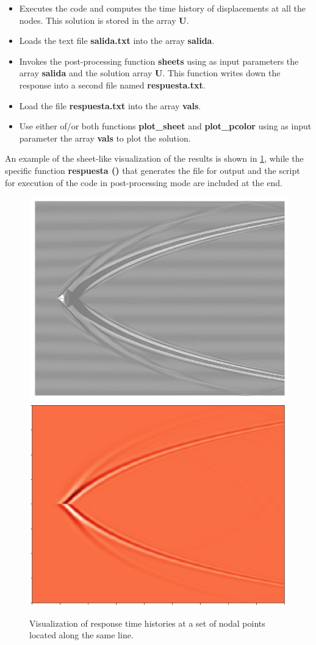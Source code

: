 \documentclass[11pt,letterpaper]{article}
\begin{document}
\begin{itemize}
\item Executes the code and computes the time history of displacements at all the nodes. This solution is stored in the array {\bf U}.
\item Loads the text file {\bf salida.txt} into the array {\bf salida}.
\item Invokes the post-processing function {\bf sheets} using as input parameters the array {\bf salida} and the solution array {\bf U}. This function writes down the response into a second file named {\bf respuesta.txt}.
\item Load the file {\bf respuesta.txt} into the array {\bf vals}.
\item Use either of/or both functions {\bf plot_sheet} and {\bf plot_pcolor} using as input parameter the array {\bf vals} to plot the solution.
\end{itemize}

An example of the sheet-like visualization of the results is shown in \cref{fig:sabanas}, while the specific function {\bf respuesta ()} that generates the file for output and the script for execution of the code in post-processing mode are included at the end.

\begin{figure}[H]
  \centering
  \includegraphics[width=8 cm]{img/sabana1.pdf}\\
    \includegraphics[width=8 cm]{img/sabana2.pdf}
  \caption{Visualization of response time histories at a set of nodal points located along the same line.}
  \label{fig:sabanas}
\end{figure} 
\end{document}
